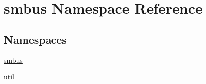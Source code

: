 \hypertarget{namespacesmbus}{}\section{smbus Namespace Reference}
\label{namespacesmbus}
\subsection*{Namespaces}
\begin{DoxyCompactItemize}
\item 
 \hyperlink{namespacesmbus_1_1smbus}{smbus}
\item 
 \hyperlink{namespacesmbus_1_1util}{util}
\end{DoxyCompactItemize}

